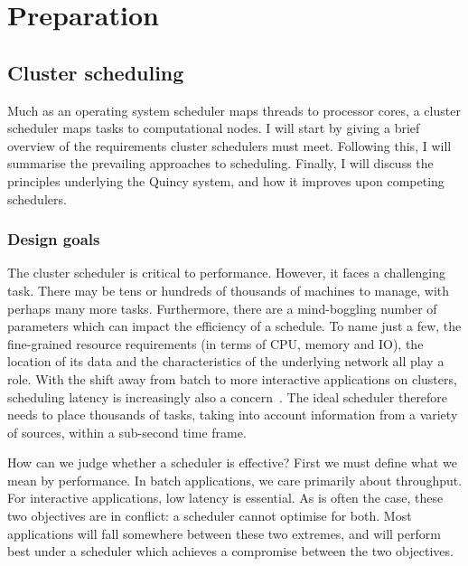 \chapter{Preparation} \label{chap:prep}


\section{Cluster scheduling} \label{sec:prep-scheduling}

Much as an operating system scheduler maps threads to processor cores, a cluster scheduler maps tasks to computational nodes. I will start by giving a brief overview of the requirements cluster schedulers must meet. Following this, I will summarise the prevailing approaches to scheduling. Finally, I will discuss the principles underlying the Quincy system, and how it improves upon competing schedulers.

\subsection{Design goals} \label{sec:prep-scheduling-goals}

The cluster scheduler is critical to performance. However, it faces a challenging task. There may be tens or hundreds of thousands of machines to manage, with perhaps many more tasks. Furthermore, there are a mind-boggling number of parameters which can impact the efficiency of a schedule. To name just a few, the fine-grained resource requirements (in terms of CPU, memory and IO), the location of its data and the characteristics of the underlying network all play a role. With the shift away from batch to more interactive applications on clusters, scheduling latency is increasingly also a concern~\cite{Ousterhout:2013}. The ideal scheduler therefore needs to place thousands of tasks, taking into account information from a variety of sources, within a sub-second time frame.

How can we judge whether a scheduler is effective? First we must define what we mean by performance. In batch applications, we care primarily about throughput. For interactive applications, low latency is essential. As is often the case, these two objectives are in conflict: a scheduler cannot optimise for both. Most applications will fall somewhere between these two extremes, and will perform best under a scheduler which achieves a compromise between the two objectives.

